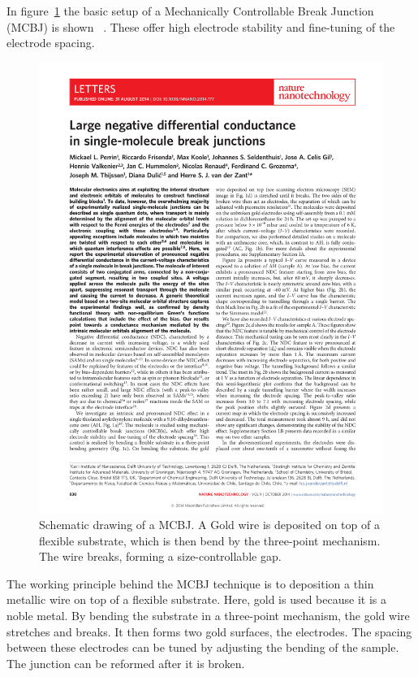 In figure~\ref{fig:mcbj} the basic setup of a Mechanically Controllable Break Junction (MCBJ) is shown~\citet{perrin} . These offer high electrode stability and fine-tuning of the electrode spacing. 
\begin{figure}[!bp]
    \centering
    \includegraphics[height=0.3\textheight,page=2, clip=true, trim=2.5cm 16.5cm 11cm 6cm]{pdf/perrinnnano.pdf}
    \caption{Schematic drawing of a MCBJ. A Gold wire is deposited on top of a flexible substrate, which is then bend by the three-point mechanism. The wire breaks, forming a size-controllable gap.}
    \label{fig:mcbj}
\end{figure}

The working principle behind the MCBJ technique is to deposition a thin metallic wire on top of a flexible substrate. Here, gold is used because it is a noble metal. By bending the substrate in a three-point mechanism, the gold wire stretches and breaks. It then forms two gold surfaces, the electrodes. The spacing between these electrodes can be tuned by adjusting the bending of the sample. The junction can be reformed after it is broken.

